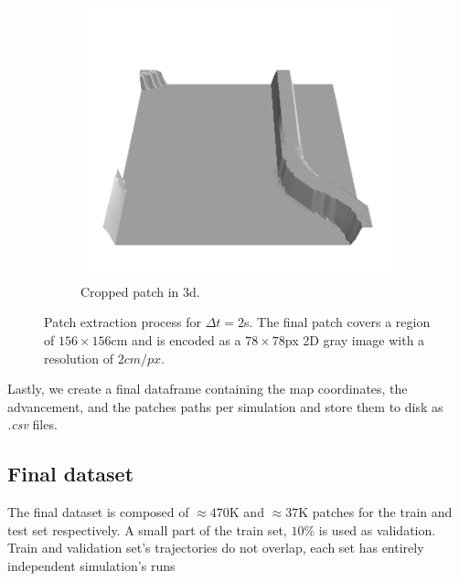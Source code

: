 \documentclass[../document.tex]{subfiles}
\begin{document}
\begin{figure}[htbp]
\begin{subfigure}[b]{0.45\textwidth}
        \includegraphics[width=\textwidth]{../img/3/crop/0.png}
        \caption{Cropped patch in 3d.}
    \end{subfigure}
\caption{Patch extraction process for $\Delta t = 2$s. The final patch covers a region of $156\times156$cm and is encoded as a $78\times78$px 2D gray image with a resolution of $2cm/px$.}   
\label{fig : patch-extract-process}
\end{figure}
Lastly, we create a final dataframe containing the map coordinates, the advancement, and the patches paths per simulation and store them to disk as \emph{.csv} files. 

\subsection{Final dataset}
The final dataset is composed of $\approx470$K and $\approx 37$K patches for the train and test set respectively. A small part of the train set, $10\%$ is used as validation. Train and validation set's trajectories do not overlap, each set has entirely independent simulation's runs
\end{document}
